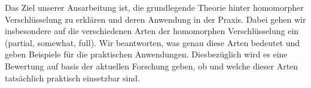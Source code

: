 \label{sec:ziel}
    Das Ziel unserer Ausarbeitung ist, die grundlegende Theorie hinter homomorpher Verschlüsselung zu erklären und deren Anwendung in der Praxis. Dabei gehen wir insbesondere auf die verschiedenen Arten der homomorphen Verschlüsselung ein (partial, somewhat, full). Wir beantworten, was genau diese Arten bedeutet und geben Beispiele für die praktischen Anwendungen. Diesbezüglich wird es eine Bewertung auf basis der aktuellen Forschung geben, ob und welche dieser Arten tatsächlich praktisch einsetzbar sind.